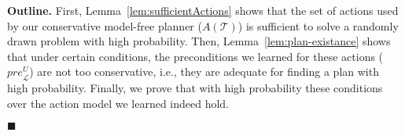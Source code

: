 \documentclass[letterpaper]{article}
\newenvironment{proof}{\noindent{\bf Proof:~~}}{\qed}
\newcommand{\qed}{\hfill\ensuremath{\blacksquare}}
\newcommand{\pre}{\textit{pre}}
\newcommand{\MEMO}[1]
{ \fbox{
\begin{minipage}[b]{7.9 cm}
#1
\end{minipage}
} }
\begin{document}
\begin{proof}
{\bf Outline.} First, Lemma~\ref{lem:sufficientActions} shows 
that the set of actions used by our conservative model-free planner ($A(\mathcal{T})$) 
is sufficient to solve a randomly drawn problem with high probability. 
Then, Lemma~\ref{lem:plan-existance} shows that 
under certain conditions, the preconditions we learned for these actions ($\pre_\mathcal{L}^U$) 
are not too conservative, i.e., they are adequate
for finding a plan with high probability.  
Finally, we prove that with high probability these conditions over the action model we learned 
indeed hold. 




\end{proof}
\end{document}
